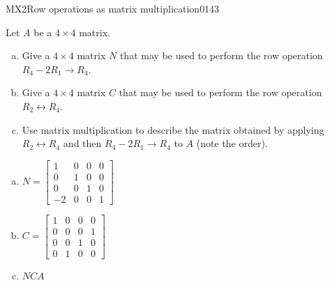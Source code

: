 \begin{exercise}{MX2}{Row operations as matrix multiplication}{0143} 
\begin{exerciseStatement} 

Let \(A\) be a \(4 \times 4\) matrix.

 

\begin{enumerate}[(a)]
\item Give a \(4 \times 4\) matrix \(N\) that may be used to perform the row operation \(R_4 - 2 R_1 \to R_4\).
\item Give a \(4 \times 4\) matrix \(C\) that may be used to perform the row operation \(R_2 \leftrightarrow R_4\).
\item Use matrix multiplication to describe the matrix obtained by applying \(R_2 \leftrightarrow R_4\) and then \(R_4 - 2 R_1 \to R_4\) to \(A\) (note the order). 
\end{enumerate}

     \end{exerciseStatement}
 \begin{exerciseAnswer} 

\begin{enumerate}[(a)]
\item \(N=\left[\begin{array}{cccc}
1 & 0 & 0 & 0 \\
0 & 1 & 0 & 0 \\
0 & 0 & 1 & 0 \\
-2 & 0 & 0 & 1
\end{array}\right]\)
\item \(C=\left[\begin{array}{cccc}
1 & 0 & 0 & 0 \\
0 & 0 & 0 & 1 \\
0 & 0 & 1 & 0 \\
0 & 1 & 0 & 0
\end{array}\right]\)
\item  \(NCA\) 
\end{enumerate}

     \end{exerciseAnswer}
 \end{exercise}



